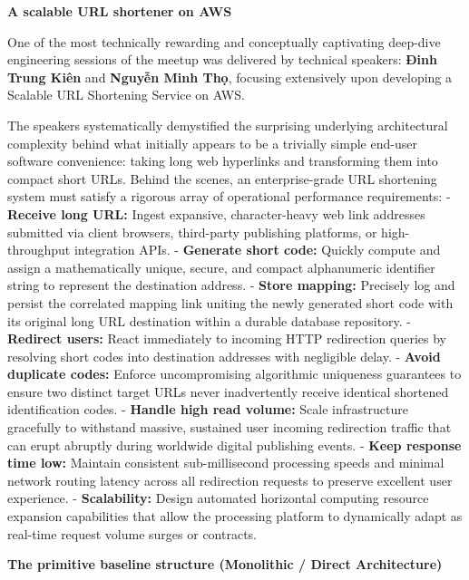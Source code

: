 \vspace{0.5em}\noindent\textbf{A scalable URL shortener on
AWS}\par

One of the most technically rewarding and conceptually captivating
deep-dive engineering sessions of the meetup was delivered by technical
speakers: \textbf{Đinh Trung Kiên} and \textbf{Nguyễn Minh Thọ},
focusing extensively upon developing a Scalable URL Shortening Service
on AWS.

The speakers systematically demystified the surprising underlying
architectural complexity behind what initially appears to be a trivially
simple end-user software convenience: taking long web hyperlinks and
transforming them into compact short URLs. Behind the scenes, an
enterprise-grade URL shortening system must satisfy a rigorous array of
operational performance requirements: - \textbf{Receive long URL:}
Ingest expansive, character-heavy web link addresses submitted via
client browsers, third-party publishing platforms, or high-throughput
integration APIs. - \textbf{Generate short code:} Quickly compute and
assign a mathematically unique, secure, and compact alphanumeric
identifier string to represent the destination address. - \textbf{Store
mapping:} Precisely log and persist the correlated mapping link uniting
the newly generated short code with its original long URL destination
within a durable database repository. - \textbf{Redirect users:} React
immediately to incoming HTTP redirection queries by resolving short
codes into destination addresses with negligible delay. - \textbf{Avoid
duplicate codes:} Enforce uncompromising algorithmic uniqueness
guarantees to ensure two distinct target URLs never inadvertently
receive identical shortened identification codes. - \textbf{Handle high
read volume:} Scale infrastructure gracefully to withstand massive,
sustained user incoming redirection traffic that can erupt abruptly
during worldwide digital publishing events. - \textbf{Keep response time
low:} Maintain consistent sub-millisecond processing speeds and minimal
network routing latency across all redirection requests to preserve
excellent user experience. - \textbf{Scalability:} Design automated
horizontal computing resource expansion capabilities that allow the
processing platform to dynamically adapt as real-time request volume
surges or contracts.

\vspace{0.5em}\noindent\textbf{The primitive baseline structure (Monolithic / Direct
Architecture)}\par

